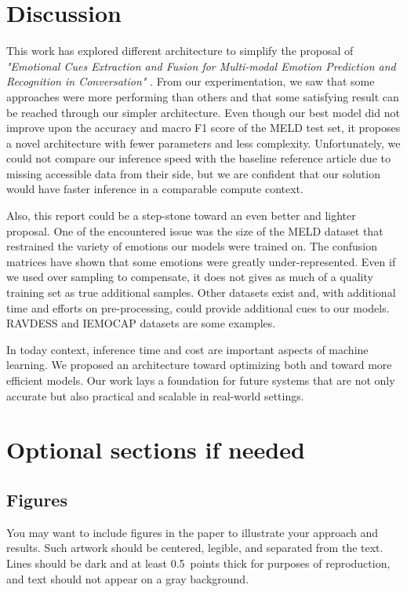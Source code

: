 \documentclass{article}
\begin{document}
\section{Discussion}
This work has explored different architecture to simplify the proposal of \textit{"Emotional Cues Extraction and Fusion for Multi-modal Emotion Prediction
and Recognition in Conversation"} \cite{ERCFusionModel}. From our experimentation, we saw that some approaches were more performing than others and that some satisfying result can be reached through our simpler architecture.
Even though our best model did not improve upon the accuracy and macro F1 score of the MELD test set, it proposes a novel architecture with fewer parameters and less complexity. Unfortunately, we could not compare our inference speed with the baseline reference article due to missing accessible data from their side, but we are confident that our solution would have faster inference in a comparable compute context. 

Also, this report could be a step-stone toward an even better and lighter proposal. One of the encountered issue was the size of the MELD dataset that restrained the variety of emotions our models were trained on. The confusion matrices have shown that some emotions were greatly under-represented. Even if we used over sampling to compensate, it does not gives as much of a quality training set as true additional samples. Other datasets exist and, with additional time and efforts on pre-processing, could provide additional cues to our models. RAVDESS \cite{livingstone2018ravdess} and IEMOCAP \cite{busso2008iemocap} datasets are some examples.

In today context, inference time and cost are important aspects of machine learning. We proposed an architecture toward optimizing both and toward more efficient models. Our work lays a foundation for future systems that are not only accurate but also practical and scalable in real-world settings.

\section{Optional sections if needed}

\subsection{Figures}

You may want to include figures in the paper to illustrate
your approach and results. Such artwork should be centered,
legible, and separated from the text. Lines should be dark and at
least 0.5~points thick for purposes of reproduction, and text should
not appear on a gray background.
\end{document}
